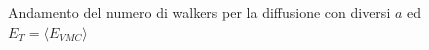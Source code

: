 \documentclass[11pt,a4paper]{article}
\begin{document}
\begin{figure}[!h]
\hspace{3mm}
\caption{Andamento del numero di walkers per la diffusione con diversi $a$ ed $E_T=\langle E_{VMC}\rangle$}
\end{figure}
\end{document}

